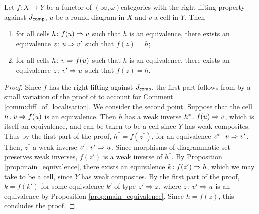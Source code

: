 \begin{lem} \label{lem:isofib_left_right_lift}
    Let \( f \colon X \to Y \) be a functor of \( (\infty, \omega) \)\nbd categories with the right lifting property against \( J_{\mathsf{comp}} \), \( u \) be a round diagram in \( X \) and \( v \) a cell in \( Y \).
    Then
    \begin{enumerate}
        \item for all cells \( h \colon f(u) \Rightarrow v \) such that \( h \) is an equivalence, there exists an equivalence \( z \colon u \Rightarrow v' \) such that \( f(z) = h \);
        \item for all cells \( h \colon v \Rightarrow f(u) \) such that \( h \) is an equivalence, there exists an equivalence \( z \colon v' \Rightarrow u \) such that \( f(z) = h \).  
    \end{enumerate}
\end{lem}
\begin{proof}
    Since \( f \) has the right lifting against \( J_{\mathsf{comp}} \), the first part follows from by a small variation of the proof of \cite[Proposition 3.7]{chanavat2024model} to account for Comment \ref{comm:diff_of_localisation}.
    We consider the second point.
    Suppose that the cell \( h \colon v \Rightarrow f(u) \) is an equivalence.
    Then \( h \) has a weak inverse \( h^* \colon f(u) \Rightarrow v \), which is itself an equivalence, and can be taken to be a cell since \( Y \) has weak composites.
    Thus by the first part of the proof, \( h^* = f(z^*) \), for an equivalence \( z^* \colon u \Rightarrow v' \).
    Then, \( z^* \) a weak inverse \( z' \colon v' \Rightarrow u \). 
    Since morphisms of diagrammatic set preserves weak inverses, \( f(z') \) is a weak inverse of \( h^* \).
    By Proposition \ref{prop:main_equivalence}, there exists an equivalence \( k \colon f(z') \Rightarrow h \), which we may take to be a cell, since \( Y \) has weak composites.
    By the first part of the proof, \( k = f(k') \) for some equivalence \( k' \) of type \( z' \Rightarrow z \), where \( z \colon v' \Rightarrow u \) is an equivalence by Proposition \ref{prop:main_equivalence}.
    Since \( h = f(z) \), this concludes the proof.
\end{proof}


